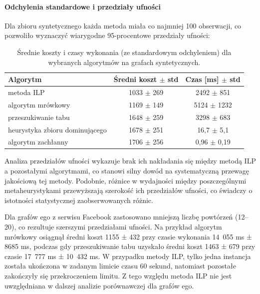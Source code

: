 \paragraph{Odchylenia standardowe i przedziały ufności}

Dla zbioru syntetycznego każda metoda miała co najmniej 100 obserwacji, co pozwoliło wyznaczyć wiarygodne 95-procentowe przedziały ufności:

\begin{table}[H]
  \caption{Średnie koszty i czasy wykonania (ze standardowym odchyleniem) dla wybranych algorytmów na grafach syntetycznych.}
  \label{tab:synthetic_alg_performance}
  \centering
  \begin{tabular}{lcc}
    \toprule
    \textbf{Algorytm}              & \textbf{Średni koszt $\pm$ std} & \textbf{Czas [ms] $\pm$ std} \\
    \midrule
    metoda ILP                     & 1033 $\pm$ 269                  & 2492 $\pm$ 851               \\
    algorytm mrówkowy              & 1169 $\pm$ 149                  & 5124 $\pm$ 1232              \\
    przeszukiwanie tabu            & 1648 $\pm$ 259                  & 3298 $\pm$ 683               \\
    heurystyka zbioru dominującego & 1678 $\pm$ 251                  & 16,7 $\pm$ 5,1               \\
    algorytm zachłanny             & 1706 $\pm$ 256                  & 0,96 $\pm$ 0,19              \\
    \bottomrule
  \end{tabular}
\end{table}

Analiza przedziałów ufności wykazuje brak ich nakładania się między metodą ILP a pozostałymi algorytmami, co stanowi silny dowód na systematyczną przewagę jakościową tej metody. Podobnie, różnice w wydajności między poszczególnymi metaheurystykami przewyższają szerokość ich przedziałów ufności, co świadczy o istotności statystycznej zaobserwowanych różnic.

Dla grafów ego z serwisu Facebook zastosowano mniejszą liczbę powtórzeń (12--20), co rezultuje szerszymi przedziałami ufności. Na przykład algorytm mrówkowy osiągnął średni koszt 1155 ± 432 przy czasie wykonania 14~055 ms ± 8685 ms, podczas gdy przeszukiwanie tabu uzyskało średni koszt 1463 ± 679 przy czasie 17~777 ms ± 10~432 ms. W przypadku metody ILP, tylko jedna instancja została ukończona w zadanym limicie czasu 60 sekund, natomiast pozostałe zakończyły się przekroczeniem limitu. Z tego względu metoda ILP nie jest uwzględniana w dalszej analizie porównawczej dla grafów ego.

